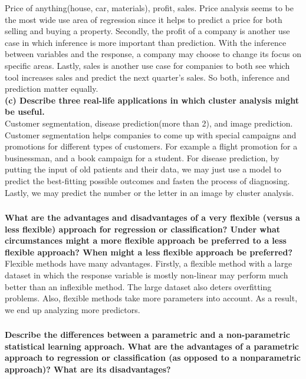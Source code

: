 \documentclass{article}
\begin{document}
Price of anything(house, car, materials), profit, sales. Price analysis seems to be the most wide use area of regression since it helps to predict a price for both selling and buying a property. 
Secondly, the profit of a company is another use case in which inference is more important than prediction. With the inference between variables and the response, a company may choose to change its focus on specific areas.
Lastly, sales is another use case for companies to both see which tool increases sales and predict the next quarter's sales. So both, inference and prediction matter equally.\\

\textbf{(c) Describe three real-life applications in which cluster analysis
might be useful.}\\

Customer segmentation, disease prediction(more than 2), and image prediction.
Customer segmentation helps companies to come up with special campaigns and promotions for different types of customers. For example a flight promotion for a businessman, and a book campaign for a student. 
For disease prediction, by putting the input of old patients and their data, we may just use a model to predict the best-fitting possible outcomes and fasten the process of diagnosing.
Lastly, we may predict the number or the letter in an image by cluster analysis.\\

\subsubsection{} \textbf{What are the advantages and disadvantages of a very flexible (versus
a less flexible) approach for regression or classification? Under what circumstances might a more flexible approach be preferred to a less flexible approach? When might a less flexible approach be preferred?} \\

Flexible methods have many advantages. Firstly, a flexible method with a large dataset in which the response variable is mostly non-linear may perform much better than an inflexible method. The large dataset also deters overfitting problems. Also, flexible methods take more parameters into account. As a result, we end up analyzing more predictors.

\subsubsection{}\textbf{Describe the differences between a parametric and a non-parametric statistical learning approach. What are the advantages of a parametric approach to regression or classification (as opposed to a nonparametric approach)? What are its disadvantages?} \\
\end{document}
